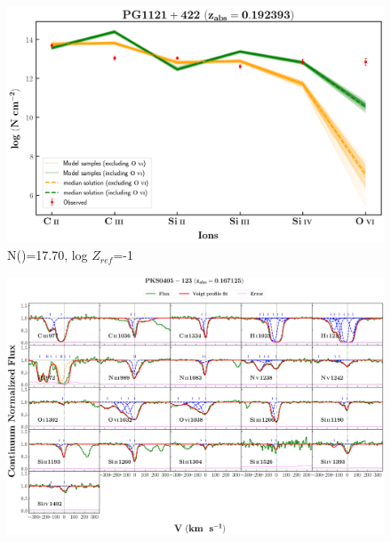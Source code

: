 \documentclass[12pt]{report}
\newcommand\ion[2]{\text{#1\,\textsc{\lowercase{#2}}}}
\begin{document}
\begin{figure}[!t]
    \centering
    \includegraphics[width=0.85\linewidth]{Ionisation-Modelling-Plots/pg1121-z=0.192393-compII.png}
    \caption{N(\ion{H}{i})=17.70, log $Z_{ref}$=-1}
\end{figure}








\newpage

\begin{landscape}

\begin{figure}
    \centering
    \vspace{-20mm}
    \hspace*{-35mm}
    \includegraphics[width=1.25\linewidth]{System-Plots/PKS0405-123_z=0.167125_sys_plot.png}
\end{figure}

\end{landscape}
\end{document}
